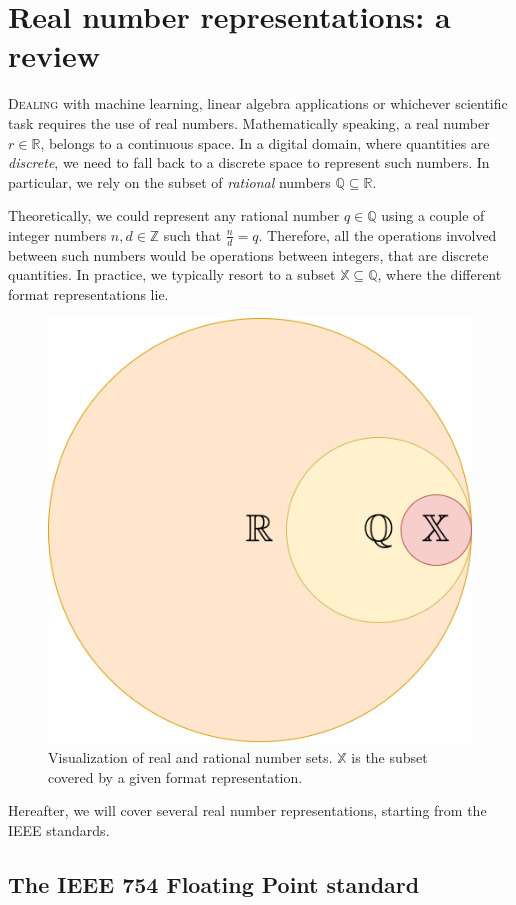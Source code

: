 


\chapter{Real number representations: a review}\label{chap:real_reps}

\lettrine{D}{ealing} with machine learning, linear algebra applications or whichever scientific task requires the use of real numbers. Mathematically speaking, a real number $r \in \mathbb{R}$, belongs to a continuous space. In a digital domain, where quantities are \textit{discrete}, we need to fall back to a discrete space to represent such numbers.  In particular, we rely on the subset of \textit{rational} numbers $\mathbb{Q} \subseteq \mathbb{R}$.

Theoretically, we could represent any rational number $q \in \mathbb{Q}$ using a couple of integer numbers $n,d \in \mathbb{Z}$ such that $\frac{n}{d} = q$. Therefore, all the operations involved between such numbers would be operations between integers, that are discrete quantities. In practice, we typically resort to a subset $\mathbb{X} \subseteq \mathbb{Q}$, where the different format representations lie.

\begin{figure}
    \centering
    \includegraphics[width=0.3\linewidth]{img/real_sets.png}
    \caption{Visualization of real and rational number sets. $\mathbb{X}$ is the subset covered by a given format representation.}
    \label{fig:my_label}
\end{figure}

Hereafter, we will cover several real number representations, starting from the IEEE standards.


\section{The IEEE 754 Floating Point standard}


